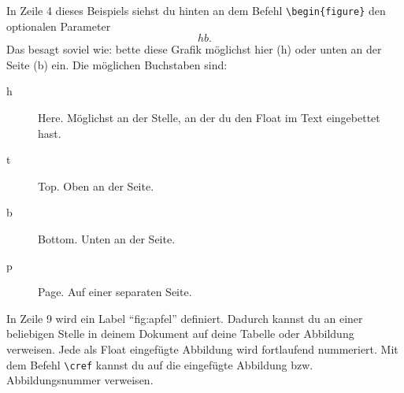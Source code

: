 In Zeile 4 dieses Beispiels siehst du hinten an dem Befehl \texttt{\textbackslash begin\{figure\}} den optionalen Parameter \texttt{\[hb.\]} Das besagt soviel wie: bette diese Grafik möglichst hier (h) oder unten an der Seite (b) ein. Die möglichen Buchstaben sind:

\begin{description}
\item[h] Here. Möglichst an der Stelle, an der du den Float im Text eingebettet hast.
\item[t] Top. Oben an der Seite.
\item[b] Bottom. Unten an der Seite.
\item[p] Page. Auf einer separaten Seite.
\end{description}

In Zeile 9 wird ein Label \enquote{fig:apfel} definiert. Dadurch kannst du an einer beliebigen Stelle in deinem Dokument auf deine Tabelle oder Abbildung verweisen. Jede als Float eingefügte Abbildung wird fortlaufend nummeriert. Mit dem Befehl \texttt{\textbackslash cref} kannst du auf die eingefügte Abbildung bzw. Abbildungsnummer verweisen.

